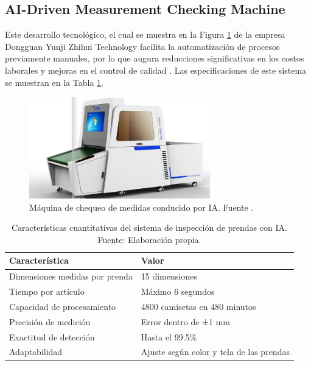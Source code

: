 \subsection{AI-Driven Measurement Checking Machine}

Este desarrollo tecnológico, el cual se muestra en la Figura \ref{fig:inspection_machine} de la empresa Dongguan Yunji Zhihui Technology facilita la automatización de procesos previamente manuales, por lo que augura reducciones significativas en los costos laborales y mejoras en el control de calidad \cite{RMG2021AIGarment}. Las especificaciones de este sistema se muestran en la Tabla \ref{tab:spec_inspection_machine}.

\begin{figure}[H]
	\centering
	\includegraphics[width=0.7\textwidth]{img/inspection_machine.png}
	\caption[Máquina de chequeo de medidas conducido por IA.]{Máquina de chequeo de medidas conducido por IA. Fuente \cite{RMG2021AIGarment}.}
	\label{fig:inspection_machine}
\end{figure}

\begin{table}[H]
	\centering
	\caption[Características cuantitativas del sistema de inspección de prendas con IA.]{Características cuantitativas del sistema de inspección de prendas con IA. Fuente: Elaboración propia.}
	\begin{tabular}{|l|l|}
		\hline
		\textbf{Característica} & \textbf{Valor} \\ \hline
		Dimensiones medidas por prenda & 15 dimensiones \\ \hline
		Tiempo por artículo & Máximo 6 segundos \\ \hline
		Capacidad de procesamiento & 4800 camisetas en 480 minutos \\ \hline
		Precisión de medición & Error dentro de ±1 mm \\ \hline
		Exactitud de detección & Hasta el 99.5\% \\ \hline
		Adaptabilidad & Ajuste según color y tela de las prendas \\ \hline
	\end{tabular}
	\label{tab:spec_inspection_machine}
\end{table}

